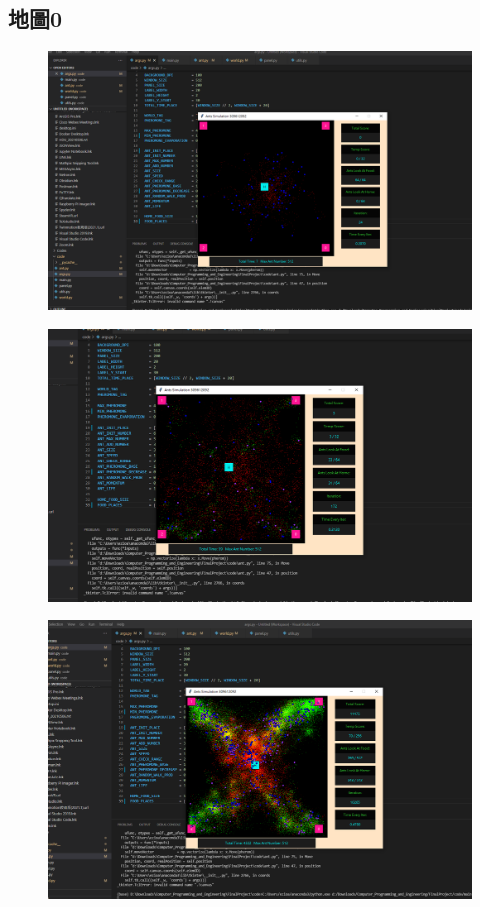 \documentclass[]{article}
\begin{document}
\subsection{地圖0}
\begin{figure}[htbp]
	\centering
	\includegraphics[width=0.9\linewidth]{../record8}
	\label{fig:record8}
\end{figure}
\begin{figure}[htbp]
	\centering
	\includegraphics[width=0.9\linewidth]{../record9}
	\label{fig:record9}
\end{figure}
\begin{figure}[htbp]
	\centering
	\includegraphics[width=0.9\linewidth]{../record10}
	\label{fig:record10}
\end{figure}
\end{document}
